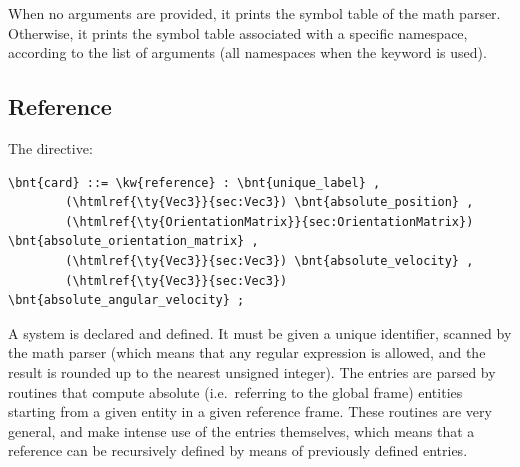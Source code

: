 When no arguments are provided, it prints the symbol table of the math parser.
Otherwise, it prints the symbol table associated with a specific namespace,
according to the list of arguments (all namespaces when the keyword  is used).



\subsection{Reference}
The  directive:
\begin{Verbatim}[commandchars=\\\{\}]
    \bnt{card} ::= \kw{reference} : \bnt{unique_label} , 
        (\htmlref{\ty{Vec3}}{sec:Vec3}) \bnt{absolute_position} ,
        (\htmlref{\ty{OrientationMatrix}}{sec:OrientationMatrix}) \bnt{absolute_orientation_matrix} ,
        (\htmlref{\ty{Vec3}}{sec:Vec3}) \bnt{absolute_velocity} ,
        (\htmlref{\ty{Vec3}}{sec:Vec3}) \bnt{absolute_angular_velocity} ;
\end{Verbatim}
A  system is declared and defined.
It must be given a unique identifier, scanned by the math parser
(which means that any regular expression is allowed, and the result is
rounded up to the nearest unsigned integer).
The entries  are parsed by routines that
compute absolute (i.e.\ referring to the global frame) entities
starting from a given entity in a given reference frame.
These routines are very general, and make intense use of the 
 entries themselves, which means that a reference 
can be recursively defined by means of previously defined 
 entries.

